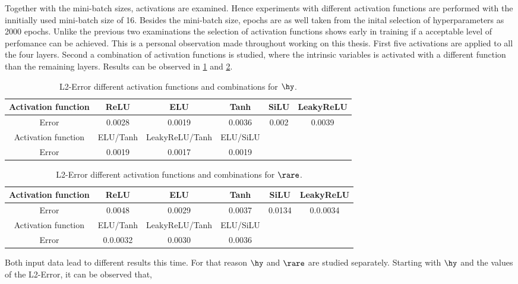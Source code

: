 Together with the mini-batch sizes, activations are examined. Hence experiments with different activation functions are performed with the innitially used mini-batch size of 16. Besides the mini-batch size, epochs are as well taken from the inital selection of hyperparameters as 2000 epochs. Unlike the previous two examinations the selection of activation functions shows early in training if a acceptable level of perfomance can be achieved. This is a personal observation made throughout working on this thesis. First five activations are applied to all the four layers. Second a combination of activation functions is studied, where the intrinsic variables is activated with a different function than the remaining layers. Results can be observed in \cref{Tab:Activations Hydro} and \cref{Tab:Activations Rare}.
\begin{table}[!htbp]\centering
	\begin{tabular}{ |c|c|c|c|c|c| }
		\hline
		Activation function & ReLU & ELU & Tanh & SiLU & LeakyReLU \\ [.5ex]
		\hline
		Error & 0.0028 & 0.0019 & 0.0036 & 0.002 & 0.0039\\ \hline
		Activation function & ELU/Tanh & LeakyReLU/Tanh & ELU/SiLU & & \\ [.5ex]
		\hline
		Error & 0.0019 & 0.0017 & 0.0019 &  & \\ \hline
	\end{tabular}
	\caption{L2-Error different activation functions and combinations for $\hy$.}
	\label{Tab:Activations Hydro}
\end{table}
\begin{table}[!htbp]\centering
	\begin{tabular}{ |c|c|c|c|c|c| }
		\hline
		Activation function & ReLU & ELU & Tanh & SiLU & LeakyReLU \\ [.5ex]
		\hline
		Error & 0.0048 & 0.0029 & 0.0037 & 0.0134 & 0.0.0034\\ \hline
		Activation function & ELU/Tanh & LeakyReLU/Tanh & ELU/SiLU & & \\ [.5ex]
		\hline
		Error & 0.0.0032 & 0.0030 & 0.0036 &  & \\ \hline
	\end{tabular}
	\caption{L2-Error different activation functions and combinations for $\rare$.}
	\label{Tab:Activations Rare} 
\end{table}
Both input data lead to different results this time. For that reason $\hy$ and $\rare$ are studied separately. Starting with $\hy$ and the values of the L2-Error, it can be observed that,
